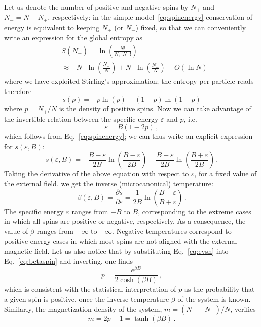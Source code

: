\documentclass[iop, twocolumns, amssymb,notitlepage]{revtex4-1}
\newcommand{\hh}{B}
\begin{document}
Let us denote the number of positive and negative spins by $N_+$ and 
$N_-=N-N_+$, respectively: in the simple model~\eqref{eq:spinenergy} 
conservation of energy is equivalent to keeping $N_+$ (or $N_-$) fixed, so that 
we can conveniently write an expression for the global entropy as 
\begin{equation}
\begin{aligned}
 & S(N_+)=\ln\left( \frac{N!}{N_+! N_-!}\right)\\
 & \approx - N_+ \ln \left(\frac{N_+}{N}\right)+N_- \ln \left(\frac{N_-}{N}\right) + O(\ln N)
\end{aligned}
\end{equation} 
where we have exploited Stirling's approximation; the entropy per particle reads therefore
\begin{equation}
 s(p)=-p\ln(p) -(1-p) \ln \left( 1-p \right)
\end{equation} 
where $p=N_+/N$ is the density of positive spins.
Now we can take advantage of the invertible relation between the specific energy $\varepsilon$ and $p$, i.e.
\begin{equation}
\label{eq:evsn}
 \varepsilon=\hh(1-2p)\,,
\end{equation} 
which follows from Eq.~\eqref{eq:spinenergy}; we can thus write an explicit expression for $s(\varepsilon,\hh)$:
\begin{equation}
 s(\varepsilon,\hh)= -\frac{\hh- \varepsilon}{2\hh} \ln \left( \frac{\hh- \varepsilon}{2\hh}\right) - \frac{\hh+ \varepsilon}{2\hh} \ln \left(\frac{\hh+ \varepsilon}{2\hh}\right) \,.
\end{equation} 
Taking the derivative of the above equation with respect to $\varepsilon$, for a fixed value of the external field, we get the inverse (microcanonical) temperature:
\begin{equation}
\label{eq:betaspin}
 \beta(\varepsilon,\hh)=\frac{\partial s}{\partial \varepsilon} = \frac{1}{2\hh}\ln\left(\frac{\hh-\varepsilon}{\hh+\varepsilon}\right)\,.
\end{equation} 
The specific energy $\varepsilon$ ranges from $-\hh$ to $\hh$, corresponding to the 
extreme cases in which all spins are positive or negative, respectively. As 
a consequence, the value of $\beta$ ranges from $-\infty$ to $+\infty$. Negative 
temperatures correspond to positive-energy cases in which most spins are not 
aligned with the external magnetic field. Let us also notice that by 
substituting Eq.~\eqref{eq:evsn} into Eq.~\eqref{eq:betaspin} and inverting, one 
finds
\begin{equation}
\label{eq:posdensity}
 p=\frac{e^{\beta \hh}}{2 \cosh(\beta \hh)}\,,
\end{equation} 
which is consistent with the statistical interpretation of $p$ as the 
probability that a given spin is positive, once the inverse temperature $\beta$ 
of the system is known. Similarly, the magnetization density of the system, 
$m=(N_+-N_-)/N$, verifies
\begin{equation}
 \label{eq:magnetization}
m=2 p -1=\tanh(\beta \hh)\,.
\end{equation} 
\end{document}
